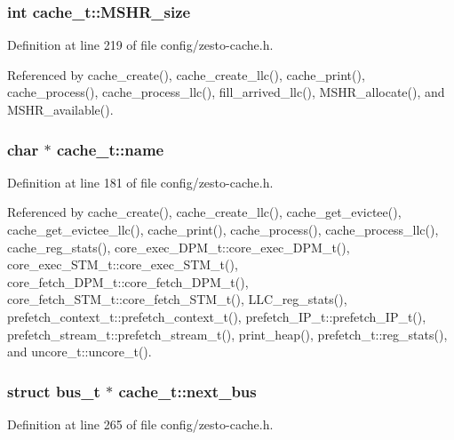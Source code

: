 \subsubsection[{MSHR\_\-size}]{\setlength{\rightskip}{0pt plus 5cm}int {\bf cache\_\-t::MSHR\_\-size}}\label{structcache__t_9c507bcd154f7bb777c6e8da5202f66d}




Definition at line 219 of file config/zesto-cache.h.

Referenced by cache\_\-create(), cache\_\-create\_\-llc(), cache\_\-print(), cache\_\-process(), cache\_\-process\_\-llc(), fill\_\-arrived\_\-llc(), MSHR\_\-allocate(), and MSHR\_\-available().
\subsubsection[{name}]{\setlength{\rightskip}{0pt plus 5cm}char $\ast$ {\bf cache\_\-t::name}}\label{structcache__t_b2a2c8eeb48b5f98cbd0265cce07aa6e}




Definition at line 181 of file config/zesto-cache.h.

Referenced by cache\_\-create(), cache\_\-create\_\-llc(), cache\_\-get\_\-evictee(), cache\_\-get\_\-evictee\_\-llc(), cache\_\-print(), cache\_\-process(), cache\_\-process\_\-llc(), cache\_\-reg\_\-stats(), core\_\-exec\_\-DPM\_\-t::core\_\-exec\_\-DPM\_\-t(), core\_\-exec\_\-STM\_\-t::core\_\-exec\_\-STM\_\-t(), core\_\-fetch\_\-DPM\_\-t::core\_\-fetch\_\-DPM\_\-t(), core\_\-fetch\_\-STM\_\-t::core\_\-fetch\_\-STM\_\-t(), LLC\_\-reg\_\-stats(), prefetch\_\-context\_\-t::prefetch\_\-context\_\-t(), prefetch\_\-IP\_\-t::prefetch\_\-IP\_\-t(), prefetch\_\-stream\_\-t::prefetch\_\-stream\_\-t(), print\_\-heap(), prefetch\_\-t::reg\_\-stats(), and uncore\_\-t::uncore\_\-t().
\subsubsection[{next\_\-bus}]{\setlength{\rightskip}{0pt plus 5cm}struct {\bf bus\_\-t} $\ast$ {\bf cache\_\-t::next\_\-bus}\hspace{0.3cm}{\tt  [read]}}\label{structcache__t_b9f9e5cc72434c40d49b5e97d06b7229}




Definition at line 265 of file config/zesto-cache.h.

